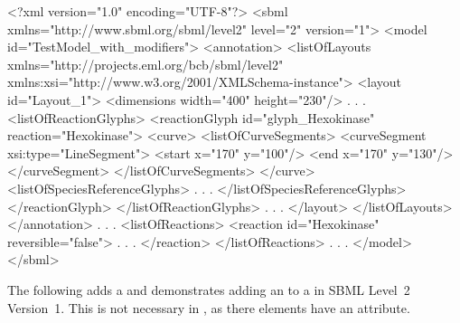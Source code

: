 \begin{example}
<?xml version="1.0" encoding="UTF-8"?>
<sbml xmlns="http://www.sbml.org/sbml/level2" level="2" version="1">
  <model id="TestModel_with_modifiers">
    <annotation>
     <listOfLayouts xmlns="http://projects.eml.org/bcb/sbml/level2"
              xmlns:xsi="http://www.w3.org/2001/XMLSchema-instance">
      <layout id="Layout_1">
        <dimensions width="400" height="230"/>
              .
              .
              .
        <listOfReactionGlyphs>
          <reactionGlyph id="glyph_Hexokinase" reaction="Hexokinase">
            <curve>
              <listOfCurveSegments>
                <curveSegment xsi:type="LineSegment">
                  <start x="170" y="100"/>
                  <end x="170" y="130"/>
                </curveSegment>
              </listOfCurveSegments>
            </curve>
            <listOfSpeciesReferenceGlyphs>
                    .
                    .
                    .
            </listOfSpeciesReferenceGlyphs>
          </reactionGlyph>
        </listOfReactionGlyphs>
             .
             .
             .
      </layout>
     </listOfLayouts>
    </annotation>
          .
          .
          .
    <listOfReactions>
      <reaction id="Hexokinase" reversible="false">
                    .
                    .
                    .
      </reaction>
    </listOfReactions>  
        .
        .
        .    
  </model>
</sbml>
\end{example}

The following adds a \SpeciesReferenceGlyph and demonstrates adding an 
 to a \SpeciesReference in SBML Level~2 Version~1. 
This is not necessary in \sbmlthreecore, as there \SpeciesReference
elements have an  attribute.

